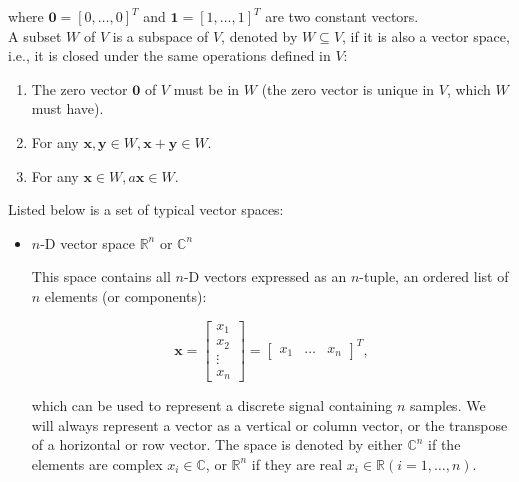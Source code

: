 \documentclass[10pt,b5paper,titlepage]{book}
\begin{document}
\begin{itemize}
        where $\mathbf{0} = [0, \ldots, 0]^{T}$ and $\mathbf{1} = [1, \ldots, 1]^{T}$
        are two constant vectors.\\

        A subset $W$ of $V$ is a subspace of $V$, denoted by $W \subseteq V$,
        if it is also a vector space, i.e., it is closed under the same
        operations defined in $V$:

        \begin{enumerate}
            \item The zero vector $\mathbf{0}$ of $V$ must be in $W$
                (the zero vector is unique in $V$, which $W$ must have).
            \item For any $\mathbf{x}, \mathbf{y} \in W, \mathbf{x} + \mathbf{y} \in W$.
            \item For any $\mathbf{x} \in W, a \mathbf{x} \in W$.
        \end{enumerate}

        Listed below is a set of typical vector spaces:

        \begin{itemize}
            \item $n$-D vector space $\mathbb{R}^{n}$ or $\mathbb{C}^{n}$

                This space contains all $n$-D vectors expressed as an  $n$-tuple,
                an ordered list of $n$ elements (or components):

                \begin{equation}
                    \mathbf{x} = \begin{bmatrix} x_1\\ x_2 \\ \vdots\\ x_n \end{bmatrix} =
                    \begin{bmatrix} x_1 & \ldots & x_n \end{bmatrix}^{T}
                ,\end{equation}

                which can be used to represent a discrete signal containing
                $n$ samples. We will always represent a vector as a vertical
                or column vector, or the transpose of a horizontal or row
                vector. The space is denoted by either $\mathbb{C}^{n}$ if the elements
                are complex $x_{i} \in \mathbb{C}$, or $\mathbb{R}^{n}$ if they
                are real $x_{i} \in \mathbb{R} (i = 1, \ldots, n)$.


\end{itemize}
\end{itemize}
\end{document}
